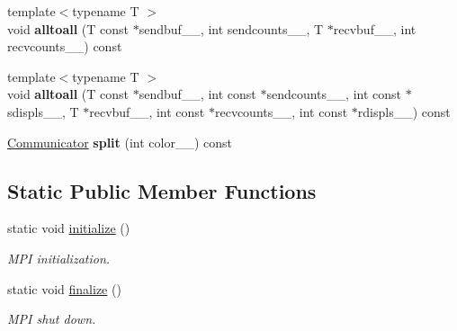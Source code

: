 \begin{DoxyCompactItemize}
\item 
\hypertarget{classsddk_1_1_communicator_a0d4efbb6ac40a3b5b1a72c9e038e4a26}{}{\footnotesize template$<$typename T $>$ }\\void {\bfseries alltoall} (T const $\ast$sendbuf\+\_\+\+\_\+, int sendcounts\+\_\+\+\_\+, T $\ast$recvbuf\+\_\+\+\_\+, int recvcounts\+\_\+\+\_\+) const \label{classsddk_1_1_communicator_a0d4efbb6ac40a3b5b1a72c9e038e4a26}

\item 
\hypertarget{classsddk_1_1_communicator_af2f2527e6267bb24c2bf460ffbb6f500}{}{\footnotesize template$<$typename T $>$ }\\void {\bfseries alltoall} (T const $\ast$sendbuf\+\_\+\+\_\+, int const $\ast$sendcounts\+\_\+\+\_\+, int const $\ast$sdispls\+\_\+\+\_\+, T $\ast$recvbuf\+\_\+\+\_\+, int const $\ast$recvcounts\+\_\+\+\_\+, int const $\ast$rdispls\+\_\+\+\_\+) const \label{classsddk_1_1_communicator_af2f2527e6267bb24c2bf460ffbb6f500}

\item 
\hypertarget{classsddk_1_1_communicator_aafa74b3637cf5ac965f9ba4b720074a4}{}\hyperlink{classsddk_1_1_communicator}{Communicator} {\bfseries split} (int color\+\_\+\+\_\+) const \label{classsddk_1_1_communicator_aafa74b3637cf5ac965f9ba4b720074a4}

\end{DoxyCompactItemize}
\subsection*{Static Public Member Functions}
\begin{DoxyCompactItemize}
\item 
static void \hyperlink{classsddk_1_1_communicator_a7cc822e3047f6c5cb940749e12c4c987}{initialize} ()
\begin{DoxyCompactList}\small\item\em M\+P\+I initialization. \end{DoxyCompactList}\item 
static void \hyperlink{classsddk_1_1_communicator_a6af0cc5c1713f6bebe0d1426fc1cf503}{finalize} ()
\begin{DoxyCompactList}\small\item\em M\+P\+I shut down. \end{DoxyCompactList}\end{DoxyCompactItemize}
